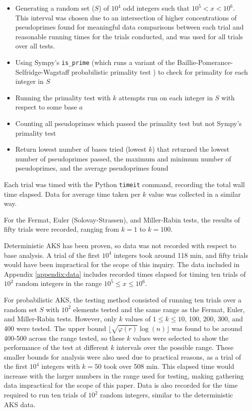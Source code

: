\documentclass{article}
\begin{document}
\begin{itemize}
    \item{Generating a random set ($S$) of $10^4$ odd integers such that $10^5 < x < 10^6$. This interval was chosen due to an intersection of higher concentrations of pseudoprimes found for meaningful data comparisons between each trial and reasonable running times for the trials conducted, and was used for all trials over all tests.}
    \item{Using Sympy's \texttt{is\_prime} (which runs a variant of the Baillie-Pomerance-Selfridge-Wagstaff probabilistic primality test \cite{sympy_number_2021}) to check for primality for each integer in $S$}
    \item{Running the primality test with $k$ attempts run on each integer in $S$ with respect to some base $a$}
    \item{Counting all pseudoprimes which passed the primality test but not Sympy's primality test}
    \item{Return lowest number of bases tried (lowest $k$) that returned the lowest number of pseudoprimes passed, the maximum and minimum number of pseudoprimes, and the average pseudoprimes found}
\end{itemize}

Each trial was timed with the Python \texttt{timeit} command, recording the total wall time elapsed. Data for average time taken per $k$ value was collected in a similar way. 

For the Fermat, Euler (Solovay-Strassen), and Miller-Rabin tests, the results of fifty trials were recorded, ranging from $k = 1$ to $k = 100$.

Deterministic AKS has been proven, so data was not recorded with respect to base analysis. A trial of the first $10^4$ integers took around 118 min, and fifty trials would have been impractical for the scope of this inquiry. The data included in Appendix \ref{appendix:data} includes recorded times elapsed for timing ten trials of $10^2$ random integers in the range $10^5 \leq x \leq 10^6$.

For probabilistic AKS, the testing method consisted of running ten trials over a random set $S$ with $10^2$ elements tested and the same range as the Fermat, Euler, and Miller-Rabin tests. However, only $k$ values of $1 \leq k \leq 10$, 100, 200, 300, and 400 were tested. The upper bound $\lfloor \sqrt{\varphi(r)}\log(n) \rfloor$ was found to be around 400-500 across the range tested, so these $k$ values were selected to show the performance of the test at different $k$ intervals over the possible range. These smaller bounds for analysis were also used due to practical reasons, as a trial of the first $10^4$ integers with $k = 50$ took over 508 min. This elapsed time would increase with the larger numbers in the range used for testing, making gathering data impractical for the scope of this paper. Data is also recorded for the time required to run ten trials of $10^2$ random integers, similar to the deterministic AKS data.
\end{document}
